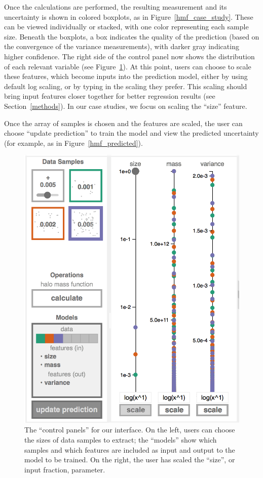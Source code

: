 Once the calculations are performed, the resulting measurement and its uncertainty is shown in colored boxplots, as in Figure~\ref{hmf_case_study}. These can be viewed individually or stacked, with one color representing each sample size. Beneath the boxplots, a box indicates the quality of the prediction (based on the convergence of the variance measurements), with darker gray  indicating higher confidence. The right side of the control panel now shows the distribution of each relevant variable (see Figure~\ref{control_panel}). At this point, users can choose to scale these features, which become inputs into the prediction model, either by using default log scaling, or by typing in the scaling they prefer. This scaling should bring input features closer together for better regression results (see Section~\ref{methods}). In our case studies, we focus on scaling the ``size'' feature.


Once the array of samples is chosen and the features are scaled, the user can choose ``update prediction'' to train the model and view the predicted uncertainty (for example, as in Figure~\ref{hmf_predicted}).

\begin{figure}[h]
    \centering
   \includegraphics[width=.3\textwidth]{images/sampling/control_panel.png}
    \caption{The ``control panels'' for our interface. On the left, users can choose the sizes of data samples to extract; the ``models'' show which samples and which features are included as input and output to the model to be trained. On the right, the user has scaled the ``size'', or input fraction, parameter.}
    \label{control_panel}
\end{figure}

